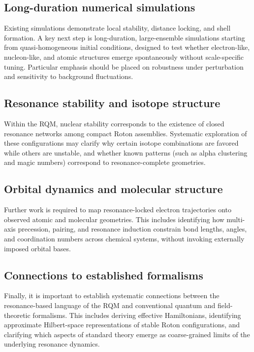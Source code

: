 \documentclass[11pt,a4paper]{article}
\begin{document}
\subsection*{Long-duration numerical simulations}

Existing simulations demonstrate local stability, distance locking, and shell formation.
A key next step is long-duration, large-ensemble simulations starting from quasi-homogeneous
initial conditions, designed to test whether electron-like, nucleon-like, and atomic
structures emerge spontaneously without scale-specific tuning. Particular emphasis should
be placed on robustness under perturbation and sensitivity to background fluctuations.

\subsection*{Resonance stability and isotope structure}

Within the RQM, nuclear stability corresponds to the existence of closed resonance networks
among compact Roton assemblies. Systematic exploration of these configurations may clarify
why certain isotope combinations are favored while others are unstable, and whether known
patterns (such as alpha clustering and magic numbers) correspond to resonance-complete
geometries.

\subsection*{Orbital dynamics and molecular structure}

Further work is required to map resonance-locked electron trajectories onto observed atomic
and molecular geometries. This includes identifying how multi-axis precession, pairing, and
resonance induction constrain bond lengths, angles, and coordination numbers across chemical
systems, without invoking externally imposed orbital bases.

\subsection*{Connections to established formalisms}

Finally, it is important to establish systematic connections between the resonance-based
language of the RQM and conventional quantum and field-theoretic formalisms. This includes
deriving effective Hamiltonians, identifying approximate Hilbert-space representations of
stable Roton configurations, and clarifying which aspects of standard theory emerge as
coarse-grained limits of the underlying resonance dynamics.
\end{document}
